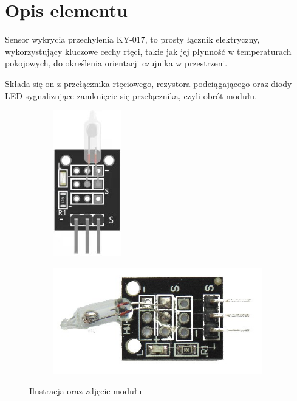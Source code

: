 \documentclass[11pt, a4paper]{article}
\institute{Instytut Robotyki i Inteligencji Maszynowej}
\begin{document}
\newpage

\section*{Opis elementu} 
Sensor wykrycia przechylenia KY-017, to prosty łącznik elektryczny, wykorzystujący kluczowe cechy
rtęci, takie jak jej płynność w temperaturach pokojowych, do określenia orientacji czujnika w przestrzeni.

Składa się on z przełącznika rtęciowego, rezystora podciągającego oraz diody
LED sygnalizujące zamknięcie się przełącznika, czyli obrót modułu.

\vspace{0.5cm}
\begin{figure}[h]
\centering
\begin{subfigure}{.5\textwidth}
  \centering
  \includegraphics[width=.3\linewidth]{fig/KY-017/zdj_modułu/obr.jpg}
\end{subfigure}%
\begin{subfigure}{.5\textwidth}
  \centering
  \includegraphics[width=.8\linewidth]{fig/KY-017/zdj_modułu/img4.jpg}
\end{subfigure}
\caption{Ilustracja oraz zdjęcie modułu}
\label{fig:test}
\end{figure}
\vspace{0.5cm}
\end{document}
